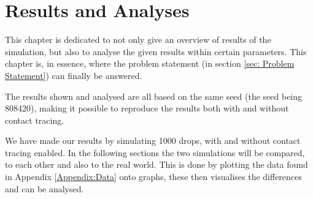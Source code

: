 \chapter{Results and Analyses} \label{chap:result}

This chapter is dedicated to not only give an overview of results of the simulation, but also to analyse the given results within certain parameters. This chapter is, in essence, where the problem statement (in section \vref{sec: Problem Statement}) can finally be answered.

The results shown and analysed are all based on the same seed (the seed being 808420), making it possible to reproduce the results both with and without contact tracing. 

We have made our results by simulating 1000 drops, with and without contact tracing enabled. In the following sections the two simulations will be compared, to each other and also to the real world. This is done by plotting the data found in Appendix \ref{Appendix:Data} onto graphs, these then visualises the differences and can be analysed. 

